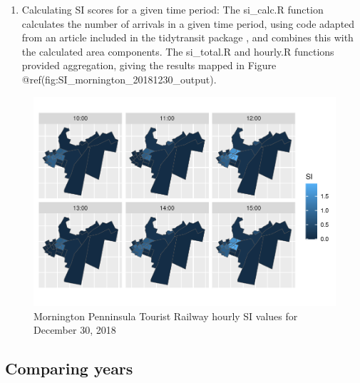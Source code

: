 \documentclass[preprint, 3p,
authoryear]{elsarticle} %
\providecommand{\tightlist}{%
  \setlength{\itemsep}{0pt}\setlength{\parskip}{0pt}}
\begin{document}
\begin{enumerate}
\def\labelenumi{(\arabic{enumi})}
\setcounter{enumi}{3}
\tightlist
\item
  Calculating SI scores for a given time period: The si\_calc.R function
  calculates the number of arrivals in a given time period, using code
  adapted from an article included in the tidytransit package
  \citep{tidytransit_departure_timetable}, and combines this with the
  calculated area components. The si\_total.R and hourly.R functions
  provided aggregation, giving the results mapped in Figure
  @ref(fig:SI\_mornington\_20181230\_output).
\end{enumerate}

\begin{figure}
\centering
\includegraphics{Leveraging_GTFS_to_assess_transit_supply_Transport_Geography_files/figure-latex/SI_mornington_20181230_output-1.pdf}
\caption{Mornington Penninsula Tourist Railway hourly SI values for
December 30, 2018}
\end{figure}

\hypertarget{comparing-years}{%
\subsection{Comparing years}\label{comparing-years}}
\end{document}
